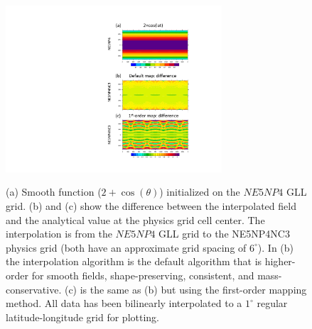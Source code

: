 \documentclass[twocol]{ametsoc}
\begin{document}
\begin{figure}[t]
\noindent\includegraphics[width=19pc,angle=0]{figs/idealized-mapping-tests-smooth-field.pdf}\\
\caption{(a) Smooth function ($2+\cos(\theta)$) initialized on the $NE5NP4$ GLL grid. (b) and (c) show the difference between the interpolated field and the analytical value at the physics grid cell center. The interpolation is from the $NE5NP4$ GLL grid to the NE5NP4NC3 physics grid (both have an approximate grid spacing of $6^\circ$). In (b) the interpolation algorithm is the default algorithm that is higher-order for smooth fields, shape-preserving, consistent, and mass-conservative. (c) is the same as (b) but using the first-order mapping method. All data has been bilinearly interpolated to a $1^\circ$ regular latitude-longitude grid for plotting.}\label{fig:remap-smooth-field}
\end{figure}
\end{document}
